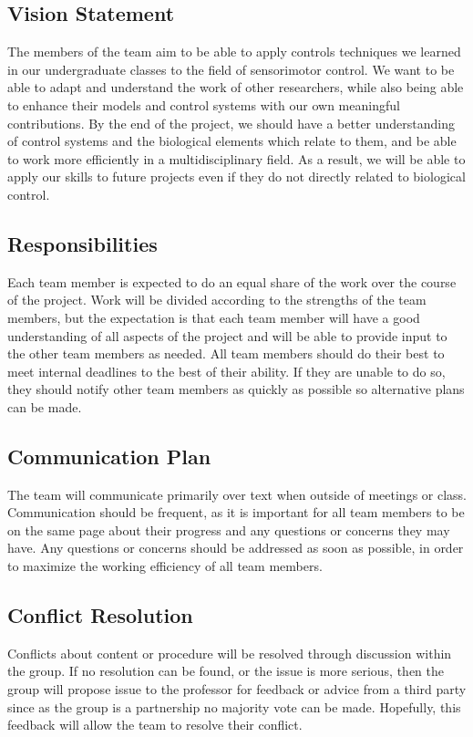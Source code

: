 \documentclass[table,12pt]{article}
\begin{document}
\subsection{Vision Statement}
The members of the team aim to be able to apply controls techniques we learned in our undergraduate classes to the field of sensorimotor control. We want to be able to adapt and understand the work of other researchers, while also being able to enhance their models and control systems with our own meaningful contributions. By the end of the project, we should have a better understanding of control systems and the biological elements which relate to them, and be able to work more efficiently in a multidisciplinary field. As a result, we will be able to apply our skills to future projects even if they do not directly related to biological control.

\subsection{Responsibilities}
Each team member is expected to do an equal share of the work over the course of the project. Work will be divided according to the strengths of the team members, but the expectation is that each team member will have a good understanding of all aspects of the project and will be able to provide input to the other team members as needed. All team members should do their best to meet internal deadlines to the best of their ability. If they are unable to do so, they should notify other team members as quickly as possible so alternative plans can be made. 

\subsection{Communication Plan}
The team will communicate primarily over text when outside of meetings or class. Communication should be frequent, as it is important for all team members to be on the same page about their progress and any questions or concerns they may have. Any questions or concerns should be addressed as soon as possible, in order to maximize the working efficiency of all team members.

\subsection{Conflict Resolution}
Conflicts about content or procedure will be resolved through discussion within the group. If no resolution can be found, or the issue is more serious, then the group will propose issue to the professor for feedback or advice from a third party since as the group is a partnership no majority vote can be made. Hopefully, this feedback will allow the team to resolve their conflict.
\end{document}
